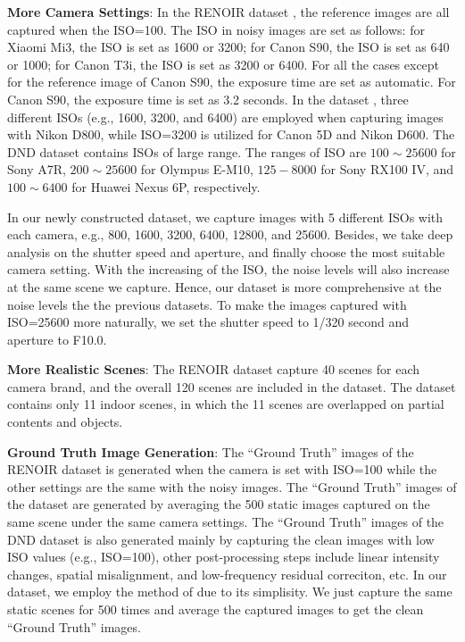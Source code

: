 \textbf{More Camera Settings}: In the RENOIR dataset \cite{RENOIR2014}, the reference images are all captured when the ISO=100. The ISO in noisy images are set as follows:  for Xiaomi Mi3, the ISO is set as 1600 or 3200; for Canon S90, the ISO is set as 640 or 1000; for Canon T3i, the ISO is set as 3200 or 6400. For all the cases except for the reference image of Canon S90, the exposure time are set as automatic. For Canon S90, the exposure time is set as 3.2 seconds. In the dataset \cite{crosschannel2016}, three different ISOs (e.g., 1600, 3200, and 6400) are employed when capturing images with Nikon D800, while ISO=3200 is utilized for Canon 5D and Nikon D600. The DND dataset \cite{dnd2017} contains ISOs of large range. The ranges of ISO are $100\sim25600$ for Sony A7R, $200\sim25600$ for Olympus E-M10, $125-8000$ for Sony RX100 IV, and $100\sim6400$ for Huawei Nexus 6P, respectively. 

In our newly constructed dataset, we capture images with 5 different ISOs with each camera, e.g., 800, 1600, 3200, 6400, 12800, and 25600. Besides, we take deep analysis on the shutter speed and aperture, and finally choose the most suitable camera setting. With the increasing of the ISO, the noise levels will also increase at the same scene we capture. Hence, our dataset is more comprehensive at the noise levels the the previous datasets. To make the images captured with ISO=25600 more naturally, we set the shutter speed to 1/320 second and aperture to F10.0. 

\textbf{More Realistic Scenes}: The RENOIR dataset \cite{RENOIR2014} capture 40 scenes for each camera brand, and the overall 120 scenes are included in the dataset.  The dataset \cite{crosschannel2016} contains only 11 indoor scenes, in which the 11 scenes are overlapped on partial contents and objects. 

\textbf{Ground Truth Image Generation}: The ``Ground Truth'' images of the RENOIR dataset \cite{RENOIR2014} is generated when the camera is set with ISO=100 while the other settings are the same with the noisy images. The ``Ground Truth'' images of the dataset \cite{crosschannel2016} are generated by averaging the 500 static images captured on the same scene under the same camera settings. The ``Ground Truth'' images of the DND dataset \cite{dnd2017} is also generated mainly by capturing the clean images with low ISO values (e.g., ISO=100), other post-processing steps include   linear intensity changes, spatial misalignment, and low-frequency residual correciton, etc. In our dataset, we employ the method of \cite{crosschannel2016} due to its simplisity. We just capture the same static scenes for 500 times and average the captured images to get the clean ``Ground Truth'' images.


